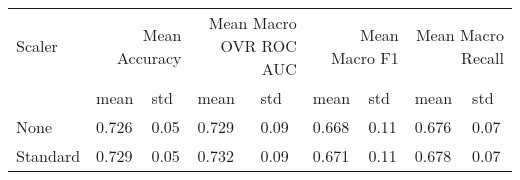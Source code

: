 \begin{tabular}{lllllllll}
\toprule
Scaler & \multicolumn{2}{r}{Mean Accuracy} & \multicolumn{2}{r}{Mean Macro OVR ROC AUC} & \multicolumn{2}{r}{Mean Macro F1} & \multicolumn{2}{r}{Mean Macro Recall} \\
 & mean & std & mean & std & mean & std & mean & std \\
\midrule
None & 0.726 & 0.05 & 0.729 & 0.09 & 0.668 & 0.11 & 0.676 & 0.07 \\
Standard & 0.729 & 0.05 & 0.732 & 0.09 & 0.671 & 0.11 & 0.678 & 0.07 \\
\bottomrule
\end{tabular}

